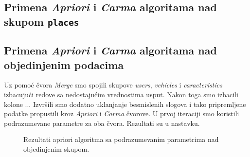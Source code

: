 \documentclass[a4paper,10pt]{article}
\begin{document}
% 	

\subsection{Primena \textit{Apriori} i \textit{Carma} algoritama nad skupom \texttt{places}}

\subsection{Primena \textit{Apriori} i \textit{Carma} algoritama nad objedinjenim podacima}

Uz pomoć čvora \textit{Merge} smo spojili skupove \textit{users}, \textit{vehicles} i \textit{caracteristics} izbacujući 
redove sa nedostajućim vrednostima usput. Nakon toga smo izbacili kolone ... Izvršili smo dodatno uklanjanje besmislenih slogova
i tako pripremljene podatke propustili kroz \textit{Apriori} i \textit{Carma} čvorove. U prvoj iteraciji smo koristili
podrazumevane parametre za oba čvora. Rezultati su u nastavku.

\begin{figure}[h!]
 \centering
 \caption{Rezultati apriori algoritma sa podrazumevanim parametrima nad objedinjenim skupom.}
\end{figure}
\end{document}
